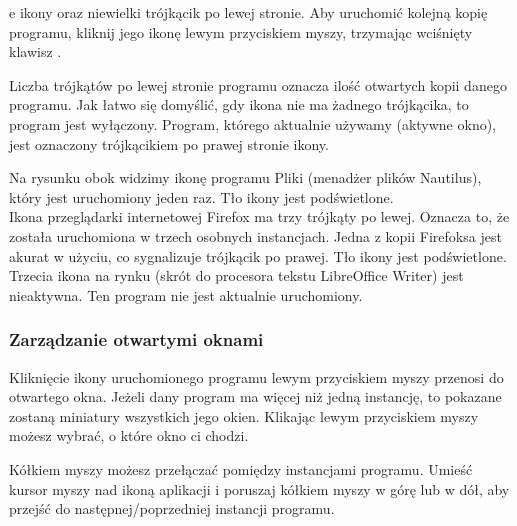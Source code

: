 e ikony oraz niewielki trójkącik po lewej stronie. Aby uruchomić kolejną kopię programu, kliknij jego ikonę lewym przyciskiem myszy, trzymając wciśnięty klawisz .

\noindent Liczba trójkątów po lewej stronie programu oznacza ilość otwartych kopii danego programu. Jak łatwo się domyślić, gdy ikona nie ma żadnego trójkącika, to program jest wyłączony. Program, którego aktualnie używamy (aktywne okno), jest oznaczony trójkącikiem po prawej stronie ikony.

\noindent Na rysunku obok widzimy ikonę programu Pliki (menadżer plików Nautilus), który jest uruchomiony jeden raz. Tło ikony jest podświetlone.\\
Ikona przeglądarki internetowej Firefox ma trzy trójkąty po lewej. Oznacza to, że została uruchomiona w trzech osobnych instancjach. Jedna z kopii Firefoksa jest akurat w użyciu, co sygnalizuje trójkącik po prawej. Tło ikony jest podświetlone.\\
Trzecia ikona na rynku (skrót do procesora tekstu LibreOffice Writer) jest nieaktywna. Ten program nie jest aktualnie uruchomiony.

\subsubsection{Zarządzanie otwartymi oknami}
Kliknięcie ikony uruchomionego programu lewym przyciskiem myszy przenosi do otwartego okna. Jeżeli dany program ma więcej niż jedną instancję, to pokazane zostaną miniatury wszystkich jego okien. Klikając lewym przyciskiem myszy możesz wybrać, o które okno ci chodzi. 

Kółkiem myszy możesz przełączać pomiędzy instancjami programu. Umieść kursor myszy nad ikoną aplikacji i poruszaj kółkiem myszy w górę lub w dół, aby przejść do następnej/poprzedniej instancji programu.

